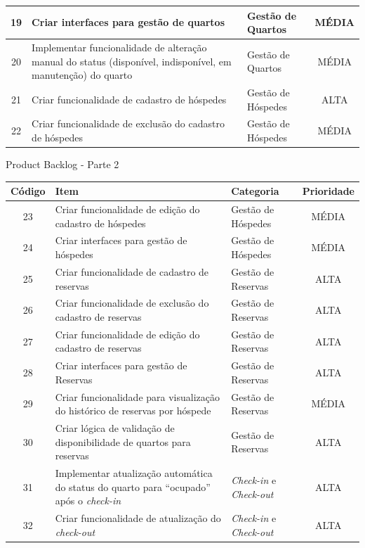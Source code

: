 \documentclass[
	12pt,				%
	openany,			%
	twoside,			%
	a4paper,			%
	english,			%
	french,				%
	spanish,			%
	brazil				%
	]{abntex2}
\begin{document}
\begin{quadro}[H]
\begin{tabular}{|c|p{6.5cm}|p{3.8cm}|c|}
		19 & Criar interfaces para gestão de quartos & Gestão de Quartos & MÉDIA \\ \hline
		20 & Implementar funcionalidade de alteração manual do status (disponível, indisponível, em manutenção) do quarto & Gestão de Quartos & MÉDIA \\ \hline
		21 & Criar funcionalidade de cadastro de hóspedes &	Gestão de Hóspedes & ALTA \\ \hline
		22 & Criar funcionalidade de exclusão do cadastro de hóspedes &
		Gestão de Hóspedes & MÉDIA \\ \hline
	\end{tabular}
\end{quadro}

\begin{quadro}[H]
	\caption{Product Backlog - Parte 2}
	\label{product_backlog_2}
	\begin{tabular}{|c|p{6.5cm}|p{3.8cm}|c|}
		\hline
		\textbf{Código} & \textbf{Item} & \textbf{Categoria} & \textbf{Prioridade} \\	\hline	
		23 & Criar funcionalidade de edição do cadastro de hóspedes &
		Gestão de Hóspedes & MÉDIA \\ \hline
		24 & Criar interfaces para gestão de hóspedes &	Gestão de Hóspedes & MÉDIA \\ \hline
		25 & Criar funcionalidade de cadastro de reservas &	Gestão de Reservas & ALTA \\ \hline
		26 & Criar funcionalidade de exclusão do cadastro de reservas &
		Gestão de Reservas & ALTA \\ \hline
		27 & Criar funcionalidade de edição do cadastro de reservas &
		Gestão de Reservas & ALTA \\ \hline
		28 & Criar interfaces para gestão de Reservas &	Gestão de Reservas & ALTA \\ \hline
		29 & Criar funcionalidade para visualização do histórico de reservas por hóspede & Gestão de Reservas &	MÉDIA \\ \hline
		30 & Criar lógica de validação de disponibilidade de quartos para reservas & Gestão de Reservas & ALTA \\ \hline
		31 & Implementar atualização automática do status do quarto para “ocupado” após o \textit {check-in} & \textit {Check-in} e \textit {Check-out} & ALTA 
		\\ \hline
		32 & Criar funcionalidade de atualização do \textit {check-out} &
		\textit {Check-in} e \textit {Check-out} &	ALTA \\ \hline

\end{tabular}
\end{quadro}
\end{document}
